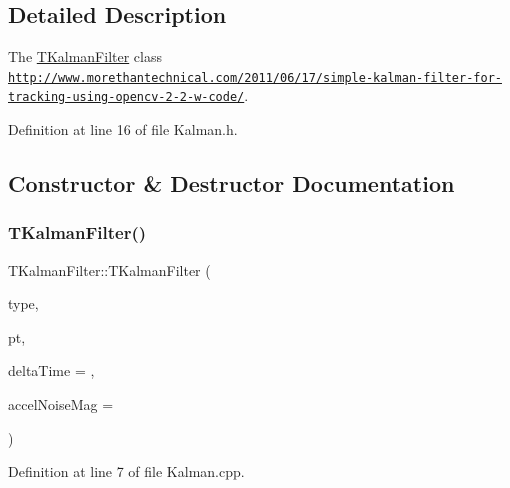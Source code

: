 \subsection{Detailed Description}
The \mbox{\hyperlink{class_t_kalman_filter}{T\+Kalman\+Filter}} class \href{http://www.morethantechnical.com/2011/06/17/simple-kalman-filter-for-tracking-using-opencv-2-2-w-code/}{\tt http\+://www.\+morethantechnical.\+com/2011/06/17/simple-\/kalman-\/filter-\/for-\/tracking-\/using-\/opencv-\/2-\/2-\/w-\/code/}. 

Definition at line 16 of file Kalman.\+h.



\subsection{Constructor \& Destructor Documentation}
\mbox{\label{class_t_kalman_filter_a10f577570d5e6f6f6abdff0b816eb6c0}} 
\subsubsection{\texorpdfstring{T\+Kalman\+Filter()}{TKalmanFilter()}\hspace{0.1cm}{\footnotesize\ttfamily [1/2]}}
{\footnotesize\ttfamily T\+Kalman\+Filter\+::\+T\+Kalman\+Filter (\begin{DoxyParamCaption}\item[{\mbox{\hyperlink{namespacetracking_a83f2c4d58ea2737f7d6296dce3eb722a}{tracking\+::\+Kalman\+Type}}}]{type,  }\item[{\mbox{\hyperlink{defines_8h_a8c42696da8f098b91374a8e8bb84b430}{Point\+\_\+t}}}]{pt,  }\item[{\mbox{\hyperlink{defines_8h_a7ce9c8817b42ab418e61756f579549ab}{track\+\_\+t}}}]{delta\+Time = {},  }\item[{\mbox{\hyperlink{defines_8h_a7ce9c8817b42ab418e61756f579549ab}{track\+\_\+t}}}]{accel\+Noise\+Mag = {} }\end{DoxyParamCaption})}



Definition at line 7 of file Kalman.\+cpp.



